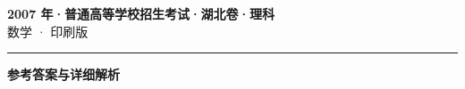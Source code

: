 \documentclass[zihao=5, a4paper]{ctexart}
\begin{document}
\begin{center}
  {\Large\bfseries 2007 年·普通高等学校招生考试·湖北卷·理科}\\[4pt]
  {\large 数学 · 印刷版}
\end{center}
\medskip
{}

\par\bigskip\hrule\bigskip
{}
\begin{center}{\large\bfseries 参考答案与详细解析}\end{center}
\smallskip

\end{document}
